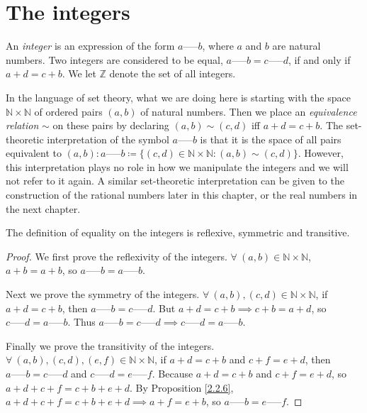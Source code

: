 \section{The integers}\label{sec 4.1}

\begin{definition}[Integers]\label{4.1.1}
An \emph{integer} is an expression of the form \(a \text{-----} b\), where \(a\) and \(b\) are natural numbers.
Two integers are considered to be equal, \(a \text{-----} b = c \text{-----} d\), if and only if \(a + d = c + b\).
We let \(\mathds{Z}\) denote the set of all integers.
\end{definition}

\begin{note}
In the language of set theory, what we are doing here is starting with the space \(\mathds{N} \times \mathds{N}\) of ordered pairs \((a, b)\) of natural numbers.
Then we place an \emph{equivalence relation} \(\sim\) on these pairs by declaring \((a, b) \sim (c, d)\) iff \(a + d = c + b\).
The set-theoretic interpretation of the symbol \(a \text{-----} b\) is that it is the space of all pairs equivalent to \((a, b): a \text{-----} b \coloneqq \{(c, d) \in \mathds{N} \times \mathds{N} : (a, b) \sim (c, d)\}\).
However, this interpretation plays no role in how we manipulate the integers and we will not refer to it again.
A similar set-theoretic interpretation can be given to the construction of the rational numbers later in this chapter, or the real numbers in the next chapter.
\end{note}

\begin{additional corollary}\label{ac 4.1.1}
The definition of equality on the integers is reflexive, symmetric and transitive.
\end{additional corollary}

\begin{proof}
We first prove the reflexivity of the integers.
\(\forall\ (a, b) \in \mathds{N} \times \mathds{N}\), \(a + b = a + b\), so \(a \text{-----} b = a \text{-----} b\).

Next we prove the symmetry of the integers.
\(\forall\ (a, b), (c, d) \in \mathds{N} \times \mathds{N}\), if \(a + d = c + b\), then \(a \text{-----} b = c \text{-----} d\).
But \(a + d = c + b \implies c + b = a + d\), so \(c \text{-----} d = a \text{-----} b\).
Thus \(a \text{-----} b = c \text{-----} d \implies c \text{-----} d = a \text{-----} b\).

Finally we prove the transitivity of the integers.
\(\forall\ (a, b), (c, d), (e, f) \in \mathds{N} \times \mathds{N}\), if \(a + d = c + b\) and \(c + f = e + d\), then \(a \text{-----} b = c \text{-----} d\) and \(c \text{-----} d = e \text{-----} f\).
Because \(a + d = c + b\) and \(c + f = e + d\), so \(a + d + c + f = c + b + e + d\).
By Proposition \ref{2.2.6}, \(a + d + c + f = c + b + e + d \implies a + f = e + b\), so \(a \text{-----} b = e \text{-----} f\).
\end{proof}

